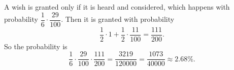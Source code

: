 A wish is granted only if it is heard and considered, which happens with probability $\dfrac16\cdot\dfrac{29}{100}$. Then it is granted with probability
\[\dfrac12\cdot1+\dfrac12\cdot\dfrac{11}{100}=\dfrac{111}{200}.\]
So the probability is
\[\dfrac16\cdot\dfrac{29}{100}\cdot\dfrac{111}{200}=\dfrac{3219}{120000}=\boxed{\dfrac{1073}{40000}}\approx2.68\%.\]
